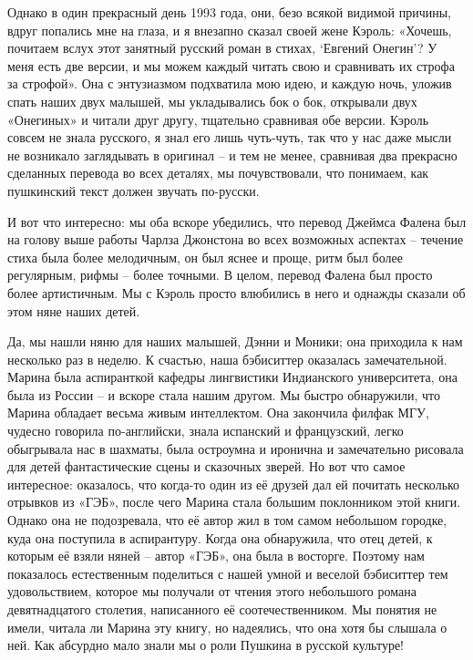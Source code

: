 \documentclass[../main.tex]{subfiles}
\begin{document}
Однако в один прекрасный день 1993 года, они, безо всякой видимой причины, вдруг попались мне на глаза, и я внезапно сказал своей жене Кэроль: «Хочешь, почитаем вслух этот занятный русский роман в стихах, \enquote*{Евгений Онегин}? У меня есть две версии, и мы можем каждый читать свою и сравнивать их строфа за строфой». Она с энтузиазмом подхватила мою идею, и каждую ночь, уложив спать наших двух малышей, мы укладывались бок о бок, открывали двух «Онегиных» и читали друг другу, тщательно сравнивая обе версии. Кэроль совсем не знала русского, я знал его лишь чуть-чуть, так что у нас даже мысли не возникало заглядывать в оригинал \--- и тем не менее, сравнивая два прекрасно сделанных перевода во всех деталях, мы почувствовали, что понимаем, как пушкинский текст должен звучать по-русски.

И вот что интересно: мы оба вскоре убедились, что перевод Джеймса Фалена был на голову выше работы Чарлза Джонстона во всех возможных аспектах \--- течение стиха была более мелодичным, он был яснее и проще, ритм был более регулярным, рифмы \--- более точными. В целом, перевод Фалена был просто более артистичным. Мы с Кэроль просто влюбились в него и однажды сказали об этом няне наших детей.

Да, мы нашли няню для наших малышей, Дэнни и Моники; она приходила к нам несколько раз в неделю. К счастью, наша бэбиситтер оказалась замечательной. Марина была аспиранткой кафедры лингвистики Индианского университета, она была из России \--- и вскоре стала нашим другом. Мы быстро обнаружили, что Марина обладает весьма живым интеллектом. Она закончила филфак МГУ, чудесно говорила по-английски, знала испанский и французский, легко обыгрывала нас в шахматы, была остроумна и иронична и замечательно рисовала для детей фантастические сцены и сказочных зверей. Но вот что самое интересное: оказалось, что когда-то один из её друзей дал ей почитать несколько отрывков из «ГЭБ», после чего Марина стала большим поклонником этой книги. Однако она не подозревала, что её автор жил в том самом небольшом городке, куда она поступила в аспирантуру. Когда она обнаружила, что отец детей, к которым её взяли няней \--- автор «ГЭБ», она была в восторге. Поэтому нам показалось естественным поделиться с нашей умной и веселой бэбиситтер тем удовольствием, которое мы получали от чтения этого небольшого романа девятнадцатого столетия, написанного её соотечественником. Мы понятия не имели, читала ли Марина эту книгу, но надеялись, что она хотя бы слышала о ней. Как абсурдно мало знали мы о роли Пушкина в русской культуре!
\end{document}
